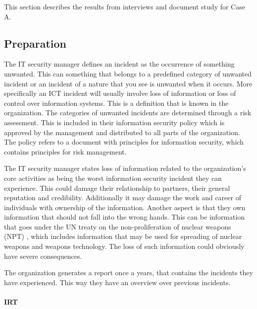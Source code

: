 This section describes the results from interviews and document study for Case A. 

\subsection{Preparation}
The IT security manager defines an incident %
as the occurrence of something unwanted. This can something that belongs to a predefined category of unwanted incident or an incident of a nature that you see is unwanted when it occurs. More specifically an \ac{ICT} incident will usually involve loss of information or loss of control over information systems. This is a definition that is known in the organization. The categories of unwanted incidents are determined through a risk assessment. This is included in their information security policy which is approved by the management and distributed to all parts of the organization. The policy refers to a document with principles for information security, which contains principles for risk management. %

The IT security manager states loss of information related to the organization's core activities as being the worst information security incident they can experience. This could damage their relationship to partners, their general reputation and credibility. Additionally it may damage the work and career of individuals with ownership of the information. %
Another aspect is that they own information that should not fall into the wrong hands. This can be information that goes under the \ac{UN} treaty on the non-proliferation of nuclear weapons (NPT) \cite{NPT}, which includes information that may be used for spreading of nuclear weapons and weapons technology. %
The loss of such information could obviously have severe consequences.

The organization generates a report once a years, that contains the incidents they have experienced. This way they have an overview over previous incidents.

\paragraph{\acl{IRT}}

